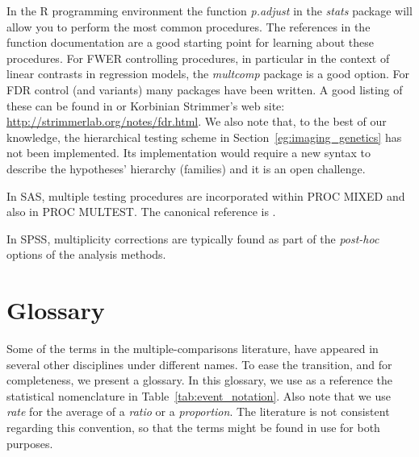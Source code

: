 \documentclass[review,12pt]{article}
\begin{document}
In the R programming environment \citep{r_development_core_team_r:_2011} the function \emph{p.adjust} in the \emph{stats} package will allow you to perform the most common procedures. The references in the function documentation are a good starting point for learning about these procedures. 
For FWER controlling procedures, in particular in the context of linear contrasts in regression models, the \emph{multcomp} package is a good option. 
For FDR control (and variants) many packages have been written. A good listing of these can be found in \citet{bretz_multiple_2010} or Korbinian Strimmer's web site: \url{http://strimmerlab.org/notes/fdr.html}. 
We also note that, to the best of our knowledge, the hierarchical testing scheme in Section~\ref{eg:imaging_genetics} has not been implemented. Its implementation would require a new syntax to describe the hypotheses' hierarchy (families) and it is an open challenge. 

In SAS, multiple testing procedures are incorporated within PROC MIXED and also in PROC MULTEST.  The canonical reference is \citet{westfall_multiple_2011}. 

In SPSS, multiplicity corrections are typically found as part of the \emph{post-hoc} options of the analysis methods.



\section{\label{sec:glossary} Glossary}
Some of the terms in the multiple-comparisons literature, have appeared in several other disciplines under different names. To ease the transition, and for completeness, we present a glossary. 
In this glossary, we use as a reference the statistical nomenclature in Table~\ref{tab:event_notation}. Also note that we use \emph{rate} for the average of a \emph{ratio} or a \emph{proportion}. The literature is not consistent regarding this convention, so that the terms might be found in use for both purposes.
\end{document}
